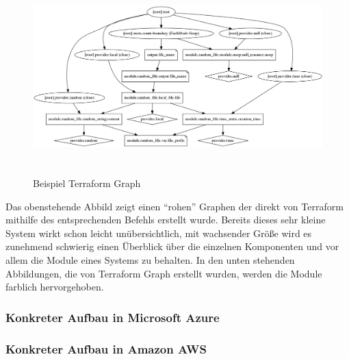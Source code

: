 \begin{figure}[H]
  \includegraphics[keepaspectratio, height=7.5cm]{fig/hauptteil/terraform-graph.png}
  \caption{Beispiel Terraform Graph}
  \centering
\end{figure}

Das obenstehende Abbild zeigt einen \enquote{rohen} Graphen der direkt
von Terraform mithilfe des entsprechenden Befehls erstellt wurde.
Bereits dieses sehr kleine System wirkt schon leicht unübersichtlich,
mit wachsender Größe wird es zunehmend schwierig einen Überblick
über die einzelnen Komponenten und vor allem die Module eines Systems
zu behalten. In den unten stehenden Abbildungen, die von Terraform Graph
erstellt wurden, werden die Module farblich hervorgehoben.

\subsubsection{Konkreter Aufbau in Microsoft Azure}

\subsubsection{Konkreter Aufbau in Amazon AWS}

